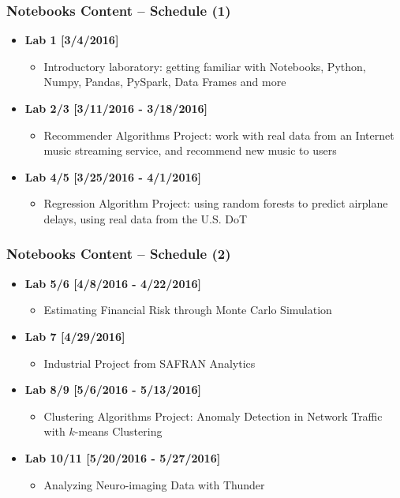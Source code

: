 \begin{frame}\frametitle{Notebooks Content -- Schedule (1)}
\begin{itemize}
	\item {\bf Lab 1 [3/4/2016]}
	\begin{itemize}
		\item Introductory laboratory: getting familiar with Notebooks, Python, Numpy, Pandas, PySpark, Data Frames and more
	\end{itemize}

	\item {\bf Lab 2/3 [3/11/2016 - 3/18/2016]}
	\begin{itemize}
		\item Recommender Algorithms Project: work with real data from an Internet music streaming service, and recommend new music to users
	\end{itemize}

	\item {\bf Lab 4/5 [3/25/2016 - 4/1/2016]}
	\begin{itemize}
		\item Regression Algorithm Project: using random forests to predict airplane delays, using real data from the U.S. DoT
	\end{itemize}
\end{itemize}
\end{frame}

\begin{frame}\frametitle{Notebooks Content -- Schedule (2)}
\begin{itemize}
	\item {\bf Lab 5/6 [4/8/2016 - 4/22/2016]}
	\begin{itemize}
		\item Estimating Financial Risk through Monte Carlo Simulation
	\end{itemize}
	\item {\bf Lab 7 [4/29/2016]}
	\begin{itemize}
		\item Industrial Project from SAFRAN Analytics
	\end{itemize}
	\item {\bf Lab 8/9 [5/6/2016 - 5/13/2016]}
	\begin{itemize}
		\item Clustering Algorithms Project: Anomaly Detection in Network Traffic with $k$-means Clustering
	\end{itemize}
	\item {\bf Lab 10/11 [5/20/2016 - 5/27/2016]}
	\begin{itemize}
		\item Analyzing Neuro-imaging Data with Thunder
	\end{itemize}
\end{itemize}
\end{frame}


